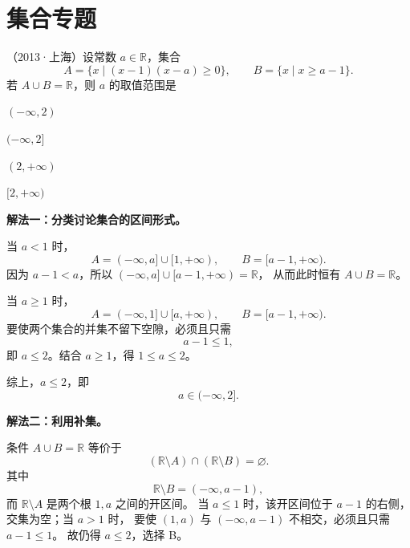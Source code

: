 \documentclass[zihao=-4]{exam-zh}
\begin{document}
\clearpage
\section{集合专题}

\begin{question}[points=5]
（2013·上海）设常数 $a\in\mathbb R$，集合
\[
 A=\{x\mid (x-1)(x-a)\ge 0\},\qquad
 B=\{x\mid x\ge a-1\}.
\]
若 $A\cup B=\mathbb R$，则 $a$ 的取值范围是 \paren[B]
\begin{choices}
  \item $(-\infty,2)$
  \item $(-\infty,2]$
  \item $(2,+\infty)$
  \item $[2,+\infty)$
\end{choices}
\begin{solution}
\textbf{解法一：分类讨论集合的区间形式。}

当 $a<1$ 时，
\[
 A=(-\infty,a]\cup[1,+\infty),\qquad B=[a-1,+\infty).
\]
因为 $a-1<a$，所以 $(-\infty,a]\cup[a-1,+\infty)=\mathbb R$，
从而此时恒有 $A\cup B=\mathbb R$。

当 $a\ge 1$ 时，
\[
 A=(-\infty,1]\cup[a,+\infty),\qquad B=[a-1,+\infty).
\]
要使两个集合的并集不留下空隙，必须且只需
\[
 a-1\le 1,
\]
即 $a\le 2$。结合 $a\ge1$，得 $1\le a\le2$。

综上，$a\le2$，即
\[
 \boxed{a\in(-\infty,2]}.
\]

\medskip
\textbf{解法二：利用补集。}

条件 $A\cup B=\mathbb R$ 等价于
\[
 (\mathbb R\setminus A)\cap(\mathbb R\setminus B)=\varnothing.
\]
其中
\[
 \mathbb R\setminus B=(-\infty,a-1),
\]
而 $\mathbb R\setminus A$ 是两个根 $1,a$ 之间的开区间。
当 $a\le1$ 时，该开区间位于 $a-1$ 的右侧，交集为空；当 $a>1$ 时，
要使 $(1,a)$ 与 $(-\infty,a-1)$ 不相交，必须且只需 $a-1\le1$。
故仍得 $a\le2$，选择 B。
\end{solution}
\end{question}
\end{document}
